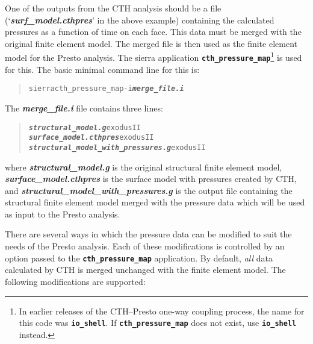 \documentclass[11pt,twoside]{article}
\newcommand{\code}[1]
   {\mbox{\bf\tt #1}\null}
\newcommand{\file}[1]
   {\mbox{\bf\em #1}\null}
\newenvironment{source}
{\small\begin{quote}\begin{alltt}}
{\end{alltt}\end{quote}\normalsize}
\begin{document}
One of the outputs from the CTH analysis should be a file
(`\file{surf\_model.cthpres}' in the above example) containing the calculated
pressures as a function of time on each face.  This data must be
merged with the original finite element model.  The merged file is
then used as the finite element model for the Presto analysis.  The sierra application
\code{cth\_pressure\_map}\footnote{In earlier releases of the
CTH--Presto one-way coupling process, the name for this code was
\code{io\_shell}. If \code{cth\_pressure\_map} does not exist, use
\code{io\_shell} instead.} is used for this.  The basic minimal
command line for this is:
\begin{source}
sierra cth\_pressure\_map {-}i \file{merge\_file.i}
\end{source}
The \file{merge\_file.i} file contains three lines:
\begin{source}
\file{structural\_model.g} exodusII
\file{surface\_model.cthpres} exodusII
\file{structural\_model\_with\_pressures.g} exodusII
\end{source}
where \file{structural\_model.g} is the original structural finite element
model, \file{surface\_model.cthpres} is the surface model with pressures
created by CTH, and \file{structural\_model\_with\_pressures.g} is the
output file containing the structural finite element model merged with
the pressure data which will be used as input to the Presto analysis.

There are several ways in which the pressure data can be modified to
suit the needs of the Presto analysis.  Each of these modifications is
controlled by an option passed to the \code{cth\_pressure\_map} application.  By
default, \textit{all} data calculated by CTH is merged unchanged with
the finite element model.  The following modifications are supported:
\end{document}
